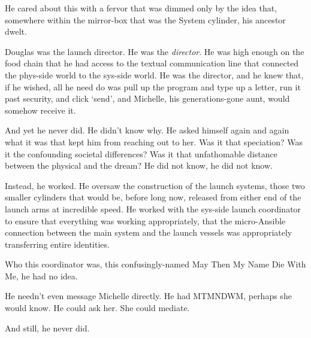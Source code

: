 He cared about this with a fervor that was dimmed only by the idea that, somewhere within the mirror-box that was the System cylinder, his ancestor dwelt.

Douglas was the launch director. He was the \emph{director}. He was high enough on the food chain that he had access to the textual communication line that connected the phys-side world to the sys-side world. He was the director, and he knew that, if he wished, all he need do was pull up the program and type up a letter, run it past security, and click `send', and Michelle, his generations-gone aunt, would somehow receive it.

And yet he never did. He didn't know why. He asked himself again and again what it was that kept him from reaching out to her. Was it that speciation? Was it the confounding societal differences? Was it that unfathomable distance between the physical and the dream? He did not know, he did not know.

Instead, he worked. He oversaw the construction of the launch systems, those two smaller cylinders that would be, before long now, released from either end of the launch arms at incredible speed. He worked with the sys-side launch coordinator to ensure that everything was working appropriately, that the micro-Ansible connection between the main system and the launch vessels was appropriately transferring entire identities.

Who this coordinator was, this confusingly-named May Then My Name Die With Me, he had no idea.

He needn't even message Michelle directly. He had MTMNDWM, perhaps she would know. He could ask her. She could mediate.

And still, he never did.
